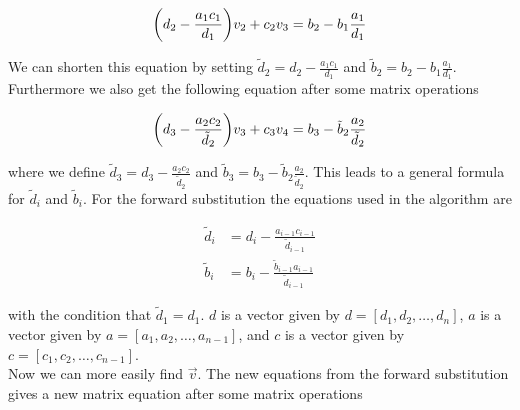 \documentclass{article}
\begin{document}
    \begin{equation*}
      \bigg( d_2 - \frac{a_1 c_1}{d_1} \bigg) v_2 + c_2 v_3 = b_2 - b_1 \frac{a_1}{d_1} \\
    \end{equation*}

    We can shorten this equation by setting $\tilde{d}_2 = d_2 - \frac{a_1 c_1}{d_1}$ and $\tilde{b}_2 = b_2 - b_1 \frac{a_1}{d_1}$. Furthermore we also get the following equation after some matrix operations

    \begin{equation*}
      \bigg( d_3 - \frac{a_2 c_2}{\tilde{d}_2} \bigg) v_3 + c_3 v_4 = b_3 - \tilde{b}_2 \frac{a_2}{\tilde{d}_2} \\
    \end{equation*}

    where we define $\tilde{d}_3 = d_3 - \frac{a_2 c_2}{\tilde{d}_2}$ and $\tilde{b}_3 = b_3 - \tilde{b}_2 \frac{a_2}{\tilde{d}_2}$. This leads to a general formula for $\tilde{d}_i$ and $\tilde{b}_i$. For the forward substitution the equations used in the algorithm are

    \begin{align}
      \tilde{d}_i &= d_i - \frac{a_{i-1} c_{i-1}}{\tilde{d} _{i-1}} \label{eq:diagonald} \\
      \tilde{b}_i &= b_i - \frac{\tilde{b}_{i-1} a_{i-1}}{\tilde{d}_{i-1}} \label{eq:vectorb}
    \end{align}

    with the condition that $\tilde{d}_1 = d_1$. $d$ is a vector given by $d = [d_1, d_2, \hdots , d_n]$, $a$ is a vector given by $a = [a_1, a_2, \hdots , a_{n-1}]$, and $c$ is a vector given by $c = [c_1, c_2, \hdots , c_{n-1}]$. \\

    Now we can more easily find $\vec{v}$. The new equations from the forward substitution gives a new matrix equation after some matrix operations
\end{document}
